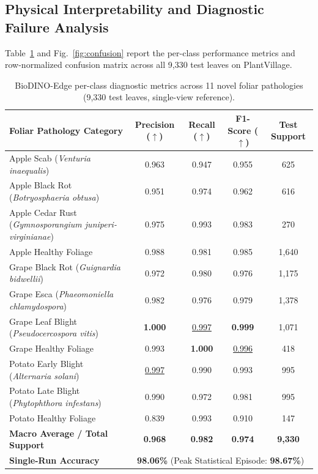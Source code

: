 \documentclass[preprint,12pt]{elsarticle}
\begin{document}
\subsection{Physical Interpretability and Diagnostic Failure Analysis}
\label{sec:per_class}

Table~\ref{tab:per_class} and Fig.~\ref{fig:confusion} report the per-class performance metrics and row-normalized confusion matrix across all 9,330 test leaves on PlantVillage.

\begin{table}[htbp]
\caption{BioDINO-Edge per-class diagnostic metrics across 11 novel foliar pathologies (9,330 test leaves, single-view reference).}
\label{tab:per_class}
\centering

\footnotesize
\setlength{\tabcolsep}{5pt}
\begin{tabularx}{\textwidth}{@{}>{\raggedright\arraybackslash}X *{4}{c}@{}}
\toprule
\textbf{Foliar Pathology Category} & \textbf{Precision ($\uparrow$)} & \textbf{Recall ($\uparrow$)} & \textbf{F1-Score ($\uparrow$)} & \textbf{Test Support} \\
\midrule
Apple Scab (\textit{Venturia inaequalis}) & 0.963 & 0.947 & 0.955 & 625 \\
Apple Black Rot (\textit{Botryosphaeria obtusa}) & 0.951 & 0.974 & 0.962 & 616 \\
Apple Cedar Rust (\textit{Gymnosporangium juniperi-virginianae}) & 0.975 & 0.993 & 0.983 & 270 \\
Apple Healthy Foliage & 0.988 & 0.981 & 0.985 & 1,640 \\
\midrule
Grape Black Rot (\textit{Guignardia bidwellii}) & 0.972 & 0.980 & 0.976 & 1,175 \\
Grape Esca (\textit{Phaeomoniella chlamydospora}) & 0.982 & 0.976 & 0.979 & 1,378 \\
Grape Leaf Blight (\textit{Pseudocercospora vitis}) & \textbf{1.000} & \underline{0.997} & \textbf{0.999} & 1,071 \\
Grape Healthy Foliage & 0.993 & \textbf{1.000} & \underline{0.996} & 418 \\
\midrule
Potato Early Blight (\textit{Alternaria solani}) & \underline{0.997} & 0.990 & 0.993 & 995 \\
Potato Late Blight (\textit{Phytophthora infestans}) & 0.990 & 0.972 & 0.981 & 995 \\
Potato Healthy Foliage & 0.839 & 0.993 & 0.910 & 147 \\
\midrule
\textbf{Macro Average / Total Support} & \textbf{0.968} & \textbf{0.982} & \textbf{0.974} & \textbf{9,330} \\
\textbf{Single-Run Accuracy} & \multicolumn{4}{c}{\textbf{98.06\%} (Peak Statistical Episode: \textbf{98.67\%})} \\
\bottomrule
\end{tabularx}
\end{table}
\end{document}
